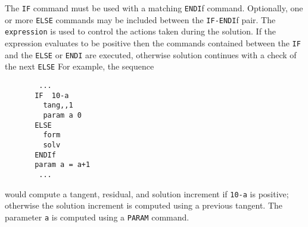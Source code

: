 \headb

The \texttt{IF} command must be used with a matching \texttt{ENDI}f command.
Optionally, one or more \texttt{ELSE} commands may be included between the
\texttt{IF-ENDI}f pair.
The \texttt{expression} is used to control the actions taken during the
solution.  If the expression evaluates to be positive then the commands
contained between the \texttt{IF} and the \texttt{ELSE} or \texttt{ENDI} are 
executed, otherwise solution continues with a check of the next \texttt{ELSE}
For example, the sequence

\begin{verbatim}
        ...
       IF  10-a
         tang,,1
         param a 0
       ELSE
         form
         solv
       ENDIf
       param a = a+1 
        ...
\end{verbatim}
\par\noindent
would compute a tangent, residual, and solution increment if \texttt{10-a}
is positive; otherwise the solution increment is computed using a
previous tangent.  The parameter \texttt{a} is computed using a \texttt{PARAM}
command.
\vfill\eject
